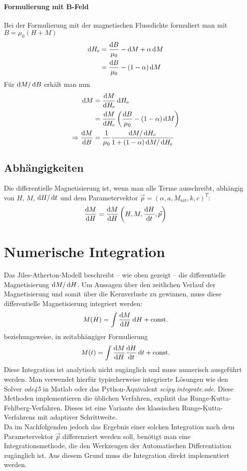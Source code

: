 \documentclass{scrartcl}
\newcommand{\He}{H_\text{e}}
\newcommand{\Msat}{M_\text{sat}}
\begin{document}
\paragraph{Formulierung mit B-Feld} Bei der Formulierung mit der magnetischen Flussdichte formuliert man mit $B = \mu_0(H + M)$
\begin{align}
	\dif \He &= \frac{\dif B}{\mu_0} - \dif M + \alpha \dif M \\
		&= \frac{\dif B}{\mu_0} - (1 - \alpha) \dif M
\end{align}
Für $\mathop{}\!\mathrm{d} M/\mathop{}\!\mathrm{d} B$ erhält man nun
\begin{align}
	\dif M &= \frac{\dif M}{\dif \He} \dif \He \\
	&=\frac{\dif M}{\dif \He}\left(\frac{\dif B}{\mu_0} - (1 - \alpha) \dif M\right) \\
	\Rightarrow \frac{\dif M}{\dif B} &= \frac{1}{\mu_0}\frac{\dif M/\dif \He}{1 + (1-\alpha) \dif M/\dif \He}
\end{align}
\subsection{Abhängigkeiten}
Die differentielle Magnetisierung ist, wenn man alle Terme ausschreibt, abhängig von $H$, $M$, $\mathop{}\!\mathrm{d} H/\mathop{}\!\mathrm{d} t$ und dem Parametervektor $\vec{p} = (\alpha, a, \Msat, k, c)^T$:
\begin{equation}
	\frac{\mathop{}\!\mathrm{d} M}{\mathop{}\!\mathrm{d} H} = \frac{\mathop{}\!\mathrm{d} M}{\mathop{}\!\mathrm{d} H}\left(H, M, \frac{\mathop{}\!\mathrm{d} H}{\mathop{}\!\mathrm{d} t}, \vec p \right)
\end{equation}
\section{Numerische Integration}
\label{sec:numeric-integration}
Das Jiles-Atherton-Modell beschreibt -- wie oben gezeigt -- die differentielle Magnetisierung $\mathop{}\!\mathrm{d} M /\mathop{}\!\mathrm{d} H$. Um Aussagen über den zeitlichen Verlauf der Magnetisierung und somit über die Kernverluste zu gewinnen, muss diese differentielle Magnetisierung integriert werden:
\begin{equation}
	M(H) = \int \frac{\mathop{}\!\mathrm{d} M}{\mathop{}\!\mathrm{d} H}\mathop{}\!\mathrm{d} H + \text{const.}
\end{equation}
beziehungsweise, in zeitabhängiger Formulierung
\begin{equation}
	M(t) = \int \frac{\mathop{}\!\mathrm{d} M}{\mathop{}\!\mathrm{d} H}\frac{\mathop{}\!\mathrm{d} H}{\mathop{}\!\mathrm{d} t}\mathop{}\!\mathrm{d} t + \text{const.}
\end{equation}
Diese Integration ist analytisch nicht zugänglich und muss numerisch ausgeführt werden. Man verwendet hierfür typischerweise integrierte Lösungen wie den Solver \emph{ode45} in Matlab oder das Python-Äquivalent \emph{scipy.integrate.ode}. Diese Methoden implementieren die üblichen Verfahren, explizit das Runge-Kutta-Fehlberg-Verfahren. Dieses ist eine Variante des klassischen Runge-Kutta-Verfahrens mit adaptiver Schrittweite.\\
Da im Nachfolgenden jedoch das Ergebnis einer solchen Integration nach dem Parametervektor $\vec p$ differenziert werden soll, benötigt man eine Integrationsmethode, die den Werkzeugen der Automatischen Differentiation zugänglich ist. Aus diesem Grund muss die Integration direkt implementiert werden.
\end{document}
